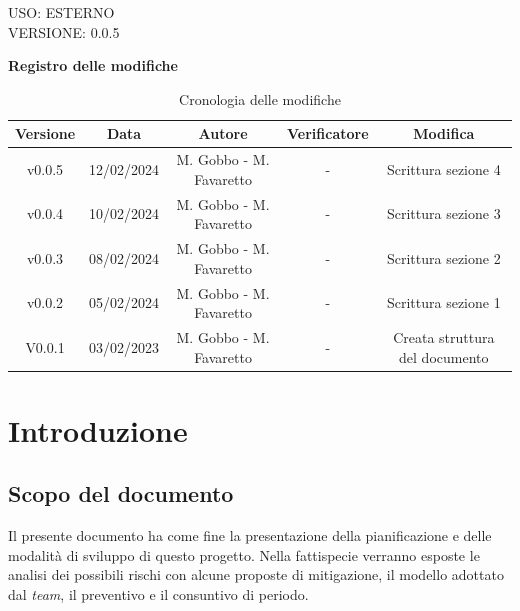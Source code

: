\documentclass[5pt]{article}
\begin{document}
\begin{flushright}
    \begin{spacing}{1}
        USO: ESTERNO\\
        VERSIONE: 0.0.5\\
    \end{spacing}
\end{flushright}


\restoregeometry

\pagebreak

\textbf{\Large Registro delle modifiche}
\begin{table}[H]
\centering
\begin{tabular}{|c|c|c|c|c|}
\hline
\textbf{Versione} & \textbf{Data} & \textbf{Autore} & \textbf{Verificatore} & \textbf{Modifica} \\
\hline
v0.0.5 & 12/02/2024 & M. Gobbo - M. Favaretto & - & Scrittura sezione 4 \\
\hline
v0.0.4 & 10/02/2024 & M. Gobbo - M. Favaretto & - & Scrittura sezione 3 \\
\hline
v0.0.3 & 08/02/2024 & M. Gobbo - M. Favaretto & - & Scrittura sezione 2 \\
\hline
v0.0.2 & 05/02/2024 & M. Gobbo - M. Favaretto & - & Scrittura sezione 1 \\
\hline
V0.0.1 & 03/02/2023 & M. Gobbo - M. Favaretto & - & Creata struttura del documento \\
\hline
\end{tabular}
\caption{Cronologia delle modifiche}
\label{tab:conference}
\end{table}

\pagebreak
\tableofcontents
\pagebreak

\section{Introduzione}
\subsection{Scopo del documento}
Il presente documento ha come fine la presentazione della pianificazione e delle modalità di sviluppo di questo progetto. 
Nella fattispecie verranno esposte le analisi dei possibili rischi con alcune proposte di mitigazione, il modello adottato dal \textit{team}, 
il preventivo e il consuntivo di periodo.
\end{document}
